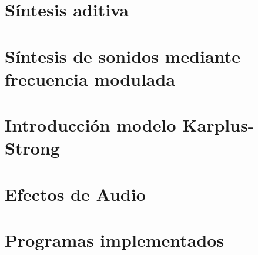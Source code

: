 







\tableofcontents
\newpage


%	
	
\section{Síntesis aditiva}
	\label{Ejercicio-2}
	

\section{Síntesis de sonidos mediante frecuencia modulada}
	\label{Ejercicio-3}
	

\section{Introducción modelo Karplus-Strong}
	\label{Ejercicio-4}
	

%	

\section{Efectos de Audio}
	\label{Ejercicio-6}
	

%	

\section{Programas implementados}
	\label{Ejercicio-8}
	


